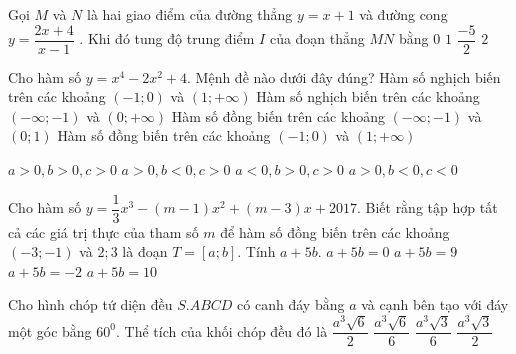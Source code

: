 \begin{ex}%
Gọi $M$ và $N$ là hai giao điểm của đường thẳng $y=x+1$ và đường cong $y=\dfrac{2x+4}{x-1}$
. Khi đó tung độ trung điểm $I$ của đoạn thẳng $MN$ bằng
\choice
{ $0$}
{\True $1$}
{ $\dfrac{-5}{2}$}
{   $2$}
\end{ex}
\begin{ex}%
Cho hàm số $y=x^4-2x^2+4$. Mệnh đề nào dưới đây đúng?
\choice
{ Hàm số nghịch biến trên các khoảng $(-1;0)$ và $(1;+\infty)$}
{ Hàm số nghịch biến trên các khoảng $(-\infty;-1)$ và $(0;+\infty)$}
{ Hàm số đồng biến trên các khoảng $(-\infty;-1)$ và $(0;1)$}
{ \True   Hàm số đồng biến trên các khoảng $(-1;0)$ và $(1;+\infty)$}
\end{ex}
\begin{ex}%
\choice
{ $a>0,b>0,c>0$}
{\True $a>0,b<0,c>0$}
{ $a<0,b>0,c>0$}
{   $a>0,b<0,c<0$}
\end{ex}
\begin{ex}%
Cho hàm số $y=\dfrac{1}{3}x^3-(m-1)x^2+(m-3)x+2017$. Biết rằng tập hợp tất cả các giá trị thực của tham số $m$ để hàm số đồng biến trên các khoảng $(-3;-1)$ và $2;3$ là đoạn $T=[a;b]$. Tính $a+5b$.
\choice
{ $a+5b=0$}
{$a+5b=9$}
{ $a+5b=-2$}
{\True   $a+5b=10$}
\loigiai{

}
\end{ex}
\begin{ex}%
Cho hình chóp tứ diện đều $S.ABCD$ có canh đáy bằng $a$ và cạnh bên tạo với đáy một góc bằng $60^0$. Thể tích của khối chóp đều đó là
\choice
{ $\dfrac{a^3\sqrt{6}}{2}$}
{\True $\dfrac{a^3\sqrt{6}}{6}$}
{ $\dfrac{a^3\sqrt{3}}{6}$}
{   $\dfrac{a^3\sqrt{3}}{2}$}
\end{ex}
